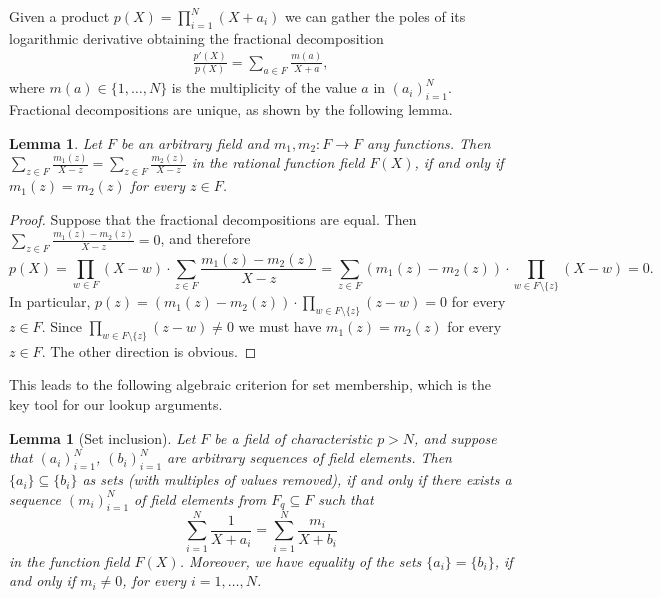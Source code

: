 \documentclass[11pt]{article}
\newtheorem{lem}[]{Lemma}
\theoremstyle{definition}
\theoremstyle{remark}
\begin{document}
Given a product $p(X)=\prod_{i=1}^N (X + a_i)$ we can gather the poles of its logarithmic derivative obtaining the fractional decomposition  
\begin{align*}
\frac{p'(X)}{p(X)} = \sum_{a\in F} \frac{m(a)}{X + a},
\end{align*}
where $m(a)\in \{1,\ldots, N\}$ is the multiplicity of the value $a$ in $(a_i)_{i=1}^N$.
Fractional decompositions are unique, as shown by the following lemma.
\begin{lem}
\label{lem:UniqueFractionalRep}
Let $F$ be an arbitrary field and $m_1, m_2: F\rightarrow F$ any functions.
Then
$
\sum_{z\in F} \frac{m_1(z)}{X - z} = \sum_{z\in F} \frac{m_2(z)}{X - z}
$
in the rational function field $F(X)$, if and only if $m_1(z)=m_2(z)$ for every $z\in F$.
\end{lem}
\begin{proof}
Suppose that the fractional decompositions are equal.  
Then $\sum_{z\in F} \frac{m_1(z)-m_2(z)}{X - z} = 0$, and therefore
\[
p(X) = \prod_{w\in F} (X - w)\cdot\sum_{z\in F} \frac{m_1(z)-m_2(z)}{X - z} = \sum_{z\in F} (m_1(z)-m_2(z))\cdot \prod_{w\in F\setminus\{z\}} (X - w) = 0.
\]
In particular,
$
p(z) = (m_1(z) - m_2(z)) \cdot  \prod_{w\in F\setminus\{z\}} (z - w)= 0
$
for every $z\in F$.
Since   $\prod_{w\in F\setminus\{z\}} (z - w) \neq 0$ we must have $m_1(z)  = m_2(z)$ for every $z\in F$. 
The other direction is obvious.
\end{proof}

This leads to the following algebraic criterion for set membership, which is the key tool for our lookup arguments.
\begin{lem}[Set inclusion]
\label{lem:batchsetmembership}
Let $F$ be a field of characteristic $p>N$, and suppose that $(a_i)_{i=1}^N$, $(b_i)_{i=1}^N$ are arbitrary sequences of field elements.
Then $\{a_i \}\subseteq \{b_i\}$ as sets (with multiples of values removed), if and only if there exists a sequence $(m_i)_{i=1}^N$ of field elements from $F_q\subseteq F$ such that
\begin{equation}
\label{e:fracs}
\sum_{i=1}^N \frac{1}{X + a_i} = \sum_{i=1}^N \frac{m_i}{X + b_i}  
\end{equation}
in the function field $F(X)$.
Moreover, we have equality of the sets $\{a_i\} = \{b_i\}$, if and only if $m_i\neq 0$, for every $i=1,\ldots, N$.
\end{lem}
\end{document}
